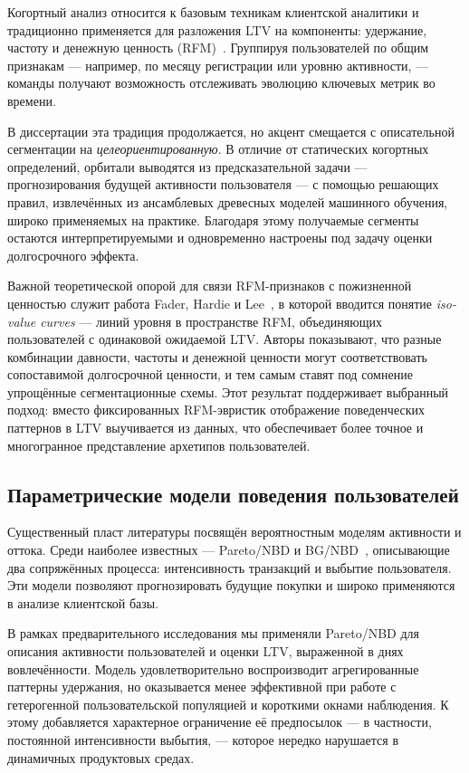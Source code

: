 Когортный анализ относится к базовым техникам клиентской аналитики и
традиционно применяется для разложения LTV на компоненты: удержание,
частоту и денежную ценность (RFM)~\cite{rosset2003modeling}. Группируя
пользователей по общим признакам --- например, по месяцу регистрации или
уровню активности, --- команды получают возможность отслеживать эволюцию
ключевых метрик во времени.

В диссертации эта традиция продолжается, но акцент смещается с описательной
сегментации на \textit{целеориентированную}. В отличие от статических
когортных определений, орбитали выводятся из предсказательной задачи ---
прогнозирования будущей активности пользователя --- с помощью решающих
правил, извлечённых из ансамблевых древесных моделей машинного обучения,
широко применяемых на практике. Благодаря этому получаемые сегменты
остаются интерпретируемыми и одновременно настроены под задачу оценки
долгосрочного эффекта.

Важной теоретической опорой для связи RFM-признаков с пожизненной ценностью
служит работа Fader, Hardie и Lee~\cite{fader2005rfm}, в которой вводится
понятие \textit{iso-value curves} --- линий уровня в пространстве RFM,
объединяющих пользователей с одинаковой ожидаемой LTV. Авторы показывают,
что разные комбинации давности, частоты и денежной ценности могут
соответствовать сопоставимой долгосрочной ценности, и тем самым ставят под
сомнение упрощённые сегментационные схемы. Этот результат поддерживает
выбранный подход: вместо фиксированных RFM-эвристик отображение
поведенческих паттернов в LTV выучивается из данных, что обеспечивает более
точное и многогранное представление архетипов пользователей.

\subsection*{Параметрические модели поведения пользователей}

Существенный пласт литературы посвящён вероятностным моделям активности и
оттока. Среди наиболее известных --- Pareto/NBD и
BG/NBD~\cite{fader2005counting}, описывающие два сопряжённых процесса:
интенсивность транзакций и выбытие пользователя. Эти модели позволяют
прогнозировать будущие покупки и широко применяются в анализе клиентской
базы.

В рамках предварительного исследования мы применяли Pareto/NBD для описания
активности пользователей и оценки LTV, выраженной в днях вовлечённости.
Модель удовлетворительно воспроизводит агрегированные паттерны удержания,
но оказывается менее эффективной при работе с гетерогенной пользовательской
популяцией и короткими окнами наблюдения. К этому добавляется характерное
ограничение её предпосылок --- в частности, постоянной интенсивности
выбытия, --- которое нередко нарушается в динамичных продуктовых средах.

